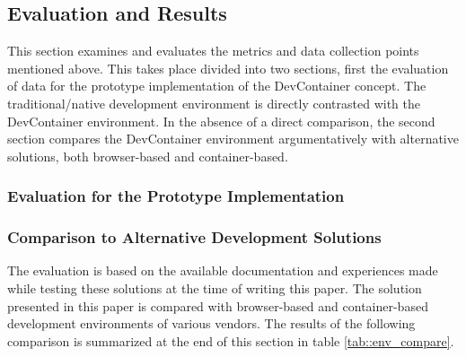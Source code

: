     \subsection{Evaluation and Results}\label{sses::eval_compare}
    This section examines and evaluates the metrics and data collection points mentioned above. This takes place divided into two sections, first the evaluation of data for the prototype implementation of the DevContainer concept. The traditional/native development environment is directly contrasted with the DevContainer environment.
    In the absence of a direct comparison, the second section compares the DevContainer environment argumentatively with alternative solutions, both browser-based and container-based.

        \subsubsection{Evaluation for the Prototype Implementation}
        


        \subsubsection{Comparison to Alternative Development Solutions}
        The evaluation is based on the available documentation and experiences made while testing these solutions at the time of writing this paper. The solution presented in this paper is compared with browser-based and container-based development environments of various vendors. The results of the following comparison is summarized at the end of this section in table \ref{tab::env_compare}.

